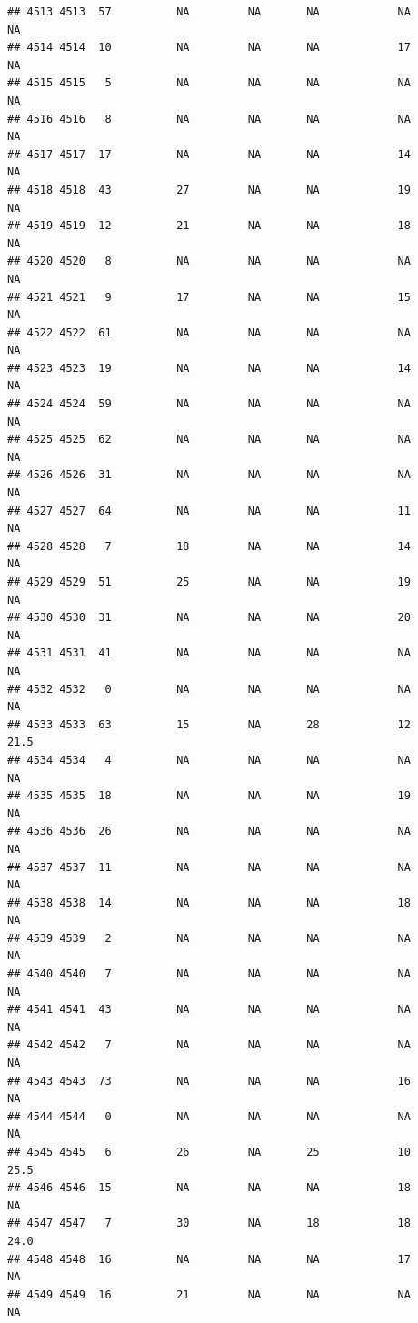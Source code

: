 \documentclass[man]{apa6}
\begin{document}
\begin{verbatim}
## 4513 4513  57          NA         NA       NA            NA       NA
## 4514 4514  10          NA         NA       NA            17       NA
## 4515 4515   5          NA         NA       NA            NA       NA
## 4516 4516   8          NA         NA       NA            NA       NA
## 4517 4517  17          NA         NA       NA            14       NA
## 4518 4518  43          27         NA       NA            19       NA
## 4519 4519  12          21         NA       NA            18       NA
## 4520 4520   8          NA         NA       NA            NA       NA
## 4521 4521   9          17         NA       NA            15       NA
## 4522 4522  61          NA         NA       NA            NA       NA
## 4523 4523  19          NA         NA       NA            14       NA
## 4524 4524  59          NA         NA       NA            NA       NA
## 4525 4525  62          NA         NA       NA            NA       NA
## 4526 4526  31          NA         NA       NA            NA       NA
## 4527 4527  64          NA         NA       NA            11       NA
## 4528 4528   7          18         NA       NA            14       NA
## 4529 4529  51          25         NA       NA            19       NA
## 4530 4530  31          NA         NA       NA            20       NA
## 4531 4531  41          NA         NA       NA            NA       NA
## 4532 4532   0          NA         NA       NA            NA       NA
## 4533 4533  63          15         NA       28            12     21.5
## 4534 4534   4          NA         NA       NA            NA       NA
## 4535 4535  18          NA         NA       NA            19       NA
## 4536 4536  26          NA         NA       NA            NA       NA
## 4537 4537  11          NA         NA       NA            NA       NA
## 4538 4538  14          NA         NA       NA            18       NA
## 4539 4539   2          NA         NA       NA            NA       NA
## 4540 4540   7          NA         NA       NA            NA       NA
## 4541 4541  43          NA         NA       NA            NA       NA
## 4542 4542   7          NA         NA       NA            NA       NA
## 4543 4543  73          NA         NA       NA            16       NA
## 4544 4544   0          NA         NA       NA            NA       NA
## 4545 4545   6          26         NA       25            10     25.5
## 4546 4546  15          NA         NA       NA            18       NA
## 4547 4547   7          30         NA       18            18     24.0
## 4548 4548  16          NA         NA       NA            17       NA
## 4549 4549  16          21         NA       NA            NA       NA

\end{verbatim}
\end{document}
